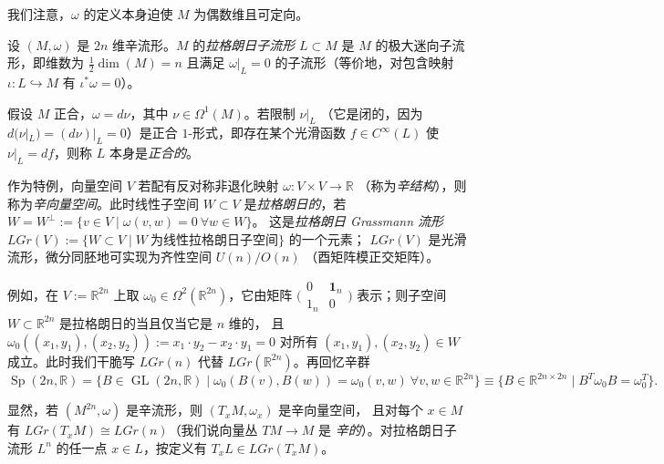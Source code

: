 我们注意，$\omega$ 的定义本身迫使 $M$ 为偶数维且可定向。

\begin{Def}\label{def:5.2}
设 $(M,\omega)$ 是 $2n$ 维辛流形。$M$ 的\emph{拉格朗日子流形} $L\subset M$
是 $M$ 的极大迷向子流形，即维数为 $\frac12\dim(M)=n$ 且满足 $\omega|_L=0$
的子流形（等价地，对包含映射 $\iota:L\hookrightarrow M$ 有 $\iota^*\omega=0$）。

假设 $M$ 正合，$\omega=d\nu$，其中 $\nu\in\Omega^1(M)$。若限制 $\nu|_L$
（它是闭的，因为 $d(\nu|_L)=(d\nu)|_L=0$）是正合 $1$-形式，即存在某个光滑函数
$f\in C^\infty(L)$ 使 $\nu|_L=df$，则称 $L$ 本身是\emph{正合的}。
\end{Def}

\begin{Rem}\label{rem:5.3}
作为特例，向量空间 $V$ 若配有反对称非退化映射 $\omega:V\times V\to\mathbb R$
（称为\emph{辛结构}），则称为\emph{辛向量空间}。此时线性子空间 $W\subset V$
是\emph{拉格朗日的}，若 $W=W^\perp:=\{v\in V\mid \omega(v,w)=0\ \forall w\in W\}$。
这是\emph{拉格朗日 Grassmann 流形}
$LGr(V):=\{W\subset V\mid W\ \text{为线性拉格朗日子空间}\}$ 的一个元素；
$LGr(V)$ 是光滑流形，微分同胚地可实现为齐性空间 $U(n)/O(n)$
（酉矩阵模正交矩阵）。

例如，在 $V:=\mathbb R^{2n}$ 上取 $\omega_0\in\Omega^2(\mathbb R^{2n})$，它由矩阵
$\bigl(\begin{smallmatrix}0&\mathbf 1_n\\ 1_n&0\end{smallmatrix}\bigr)$
表示；则子空间 $W\subset\mathbb R^{2n}$ 是拉格朗日的当且仅当它是 $n$ 维的，
且 $\omega_0((x_1,y_1),(x_2,y_2)):=x_1\cdot y_2-x_2\cdot y_1=0$ 对所有
$(x_1,y_1),(x_2,y_2)\in W$ 成立。此时我们干脆写 $LGr(n)$ 代替
$LGr(\mathbb R^{2n})$。再回忆辛群
\[
\operatorname{Sp}(2n,\mathbb R)=\{B\in\operatorname{GL}(2n,\mathbb R)\mid
\omega_0(B(v),B(w))=\omega_0(v,w)\ \forall v,w\in\mathbb R^{2n}\}
\equiv\{B\in\mathbb R^{2n\times2n}\mid B^T\omega_0B=\omega_0^T\}.
\]


显然，若 $(M^{2n},\omega)$ 是辛流形，则 $(T_xM,\omega_x)$ 是辛向量空间，
且对每个 $x\in M$ 有 $LGr(T_xM)\cong LGr(n)$（我们说向量丛 $TM\to M$ 是
\emph{辛的}）。对拉格朗日子流形 $L^n$ 的任一点 $x\in L$，按定义有
$T_xL\in LGr(T_xM)$。
\end{Rem}

